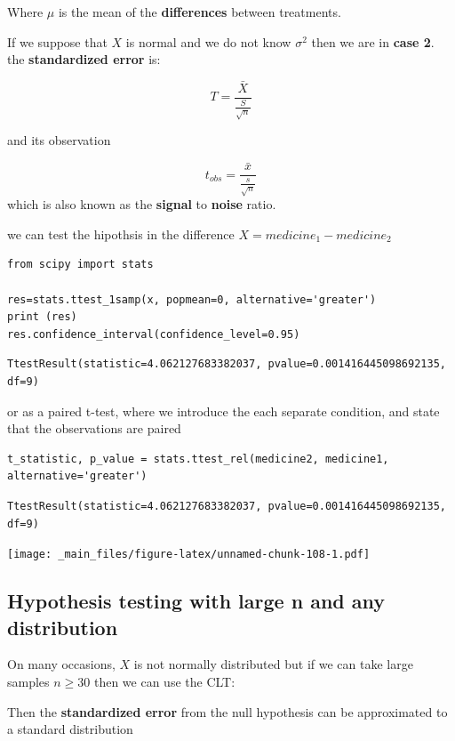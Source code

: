 \documentclass[
]{book}
\begin{document}
Where \(\mu\) is the mean of the \textbf{differences} between treatments.

If we suppose that \(X\) is normal and we do not know \(\sigma^2\) then we are in \textbf{case 2}. the \textbf{standardized error} is:

\[T=\frac{\bar{X}}{\frac{S}{\sqrt{n}}}\]

and its observation

\[t_{obs}=\frac{\bar{x}}{\frac{s}{\sqrt{n}}}\]
which is also known as the \textbf{signal} to \textbf{noise} ratio.

we can test the hipothsis in the difference \(X=medicine_1-medicine_2\)

\begin{verbatim}
from scipy import stats

res=stats.ttest_1samp(x, popmean=0, alternative='greater')
print (res)
res.confidence_interval(confidence_level=0.95)
\end{verbatim}

\begin{verbatim}
TtestResult(statistic=4.062127683382037, pvalue=0.001416445098692135, df=9)
\end{verbatim}

or as a paired t-test, where we introduce the each separate condition, and state that the observations are paired

\begin{verbatim}
t_statistic, p_value = stats.ttest_rel(medicine2, medicine1, alternative='greater')
\end{verbatim}

\begin{verbatim}
TtestResult(statistic=4.062127683382037, pvalue=0.001416445098692135, df=9)
\end{verbatim}

\texttt{[image: \_main\_files/figure-latex/unnamed-chunk-108-1.pdf]}

\hypertarget{hypothesis-testing-with-large-n-and-any-distribution}{%
\subsection{Hypothesis testing with large n and any distribution}\label{hypothesis-testing-with-large-n-and-any-distribution}}

On many occasions, \(X\) is not normally distributed but if we can take large samples \(n \ge 30\) then we can use the CLT:

Then the \textbf{standardized error} from the null hypothesis can be approximated to a standard distribution
\end{document}
